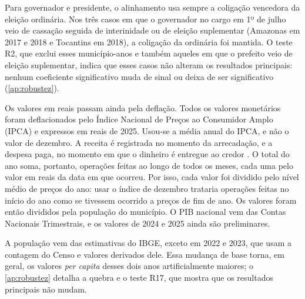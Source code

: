 Para governador e presidente, o alinhamento usa sempre a coligação vencedora da eleição ordinária. Nos três casos em que o governador no cargo em 1º de julho veio de cassação seguida de interinidade ou de eleição suplementar (Amazonas em 2017 e 2018 e Tocantins em 2018), a coligação da ordinária foi mantida. O teste R2, que exclui esses município-anos e também aqueles em que o prefeito veio de eleição suplementar, indica que esses casos não alteram os resultados principais: nenhum coeficiente significativo muda de sinal ou deixa de ser significativo (\autoref{ap:robustez}).

Os valores em reais passam ainda pela deflação. Todos os valores monetários foram deflacionados pelo Índice Nacional de Preços ao Consumidor Amplo (IPCA) e expressos em reais de 2025. Usou-se a média anual do IPCA, e não o valor de dezembro. A receita é registrada no momento da arrecadação, e a despesa paga, no momento em que o dinheiro é entregue ao credor \parencite[p.~55, 106]{mcasp2024}. O total do ano soma, portanto, operações feitas ao longo de todos os meses, cada uma pelo valor em reais da data em que ocorreu. Por isso, cada valor foi dividido pelo nível médio de preços do ano: usar o índice de dezembro trataria operações feitas no início do ano como se tivessem ocorrido a preços de fim de ano. Os valores foram então divididos pela população do município. O PIB nacional vem das Contas Nacionais Trimestrais, e os valores de 2024 e 2025 ainda são preliminares.

A população vem das estimativas do IBGE, exceto em 2022 e 2023, que usam a contagem do Censo e valores derivados dele. Essa mudança de base torna, em geral, os valores \textit{per capita} desses dois anos artificialmente maiores; o \autoref{ap:robustez} detalha a quebra e o teste R17, que mostra que os resultados principais não mudam.

